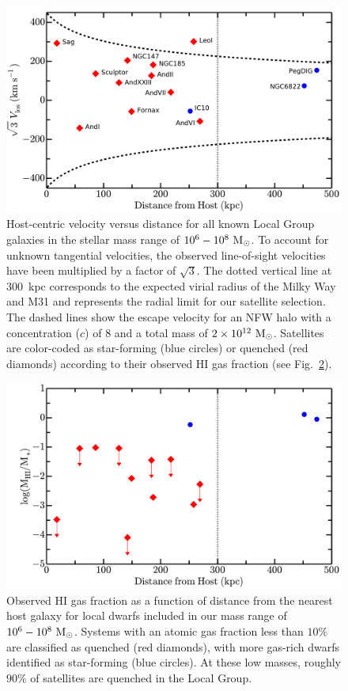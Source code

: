 \begin{figure}
  \centering
 \hspace*{-0.05in}
 \includegraphics[width=6.5in]{ch1_f1.pdf}
 \caption{Host-centric velocity versus distance for all known Local
   Group galaxies in the stellar mass range of
   $10^{6}-10^{8}~{\rm M}_{\odot}$. To account for unknown tangential
   velocities, the observed line-of-sight velocities have been multiplied by a
   factor of $\sqrt{3}$. The dotted vertical line at $300$~kpc
   corresponds to the expected virial radius of the Milky Way and M31
   and represents the radial limit for our satellite selection. The
   dashed lines show the escape velocity for an NFW halo with a
   concentration ($c$) of $8$ and a total mass of $2\times 10^{12}\
   \rm {\rm M}_{\odot}$. Satellites are color-coded as star-forming (blue
   circles) or quenched (red diamonds) according to their observed
   H{\scriptsize I} gas fraction (see
   Fig.~\ref{fig:h1}). }
 \label{fig:vlos}
\end{figure}



\begin{figure}
 \centering
 \hspace*{-0.08in}
 \includegraphics[width=6.5in]{ch1_f2.pdf}
 \caption{Observed H{\scriptsize I} gas fraction as a function of
   distance from the nearest host galaxy for local dwarfs included in
   our mass range of $10^6-10^{8}~{\rm M}_{\odot}$. Systems with an atomic gas
   fraction less than $10\%$ are classified as quenched (red
   diamonds), with more gas-rich dwarfs identified as star-forming
   (blue circles). At these low masses, roughly $90\%$ of satellites
   are quenched in the Local Group.}
 \label{fig:h1}
\end{figure}

